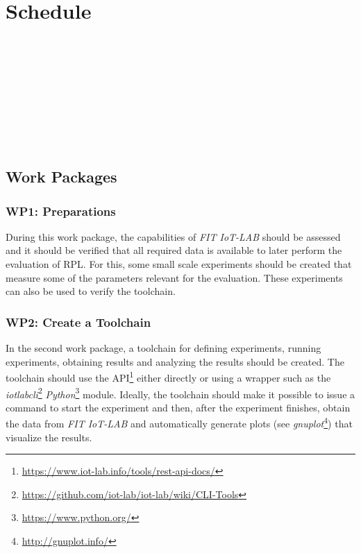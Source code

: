 \documentclass[
  a4paper,
  11pt,
  style=screen,
  extramargin,
  bcor=10mm,
  rgb,
  hyperrefdark,
  abstract=off,
  lnum,
]{tubsartcl}
\newcommand{\fitlab}{\emph{FIT IoT-LAB} }
\begin{document}
\section{Schedule} %

\begin{ganttchart}{1}{12}
 \\
 \\
 \\
 \\
 \\
 \\
 \\
 \\
\end{ganttchart}

\subsection{Work Packages} %

\subsubsection{WP1: Preparations}

During this work package, the capabilities of \fitlab should be assessed and it should be verified that all required data is available to later perform the evaluation of \ac{RPL}.
For this, some small scale experiments should be created that measure some of the parameters relevant for the evaluation.
These experiments can also be used to verify the toolchain.

\subsubsection{WP2: Create a Toolchain} %

In the second work package, a toolchain for defining experiments, running experiments, obtaining results and analyzing the results should be created.
The toolchain should use the \ac{API}\footnote{\url{https://www.iot-lab.info/tools/rest-api-docs/}} either directly or using a wrapper such as the \emph{iotlabcli}\footnote{\url{https://github.com/iot-lab/iot-lab/wiki/CLI-Tools}} \emph{Python}\footnote{\url{https://www.python.org/}} module.
Ideally, the toolchain should make it possible to issue a command to start the experiment and then, after the experiment finishes, obtain the data from \fitlab and automatically generate plots (see \emph{gnuplot}\footnote{\url{http://gnuplot.info/}}) that visualize the results.
\end{document}
